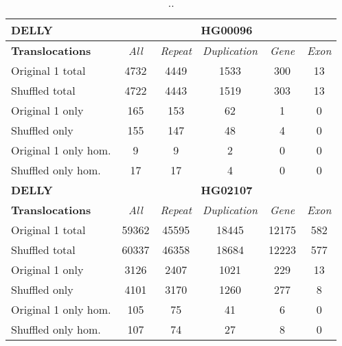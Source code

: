 \begin{table}[htb]
\caption{ .. }
\begin{center}
\begin{tabular}{|l|c||c|c|c|c|}
\hline
{\bf DELLY} & \multicolumn{5}{|c|}{\bf HG00096} \\
\hline
\cline{2-6}
{\bf Translocations} & {\it All} & {\it Repeat} & {\it Duplication} & {\it Gene} & {\it Exon} \\
\hline
Original 1 total & 4732 & 4449 & 1533 & 300 & 13\\ 
\hline
Shuffled total & 4722 & 4443 & 1519 & 303 & 13\\ 
\hline
Original 1 only & 165 & 153 & 62 & 1 & 0\\ 
\hline
Shuffled only & 155 & 147 & 48 & 4 & 0\\ 
\hline
Original 1 only hom. & 9 & 9 & 2 & 0 & 0\\ 
\hline
Shuffled only hom. & 17 & 17 & 4 & 0 & 0\\ 
\hline
\hline
{\bf DELLY} & \multicolumn{5}{|c|}{\bf HG02107} \\
\hline
\cline{2-6}
{\bf Translocations} & {\it All} & {\it Repeat} & {\it Duplication} & {\it Gene} & {\it Exon} \\
\hline
Original 1 total & 59362 & 45595 & 18445 & 12175 & 582\\ 
\hline
Shuffled total & 60337 & 46358 & 18684 & 12223 & 577\\ 
\hline
Original 1 only & 3126 & 2407 & 1021 & 229 & 13\\ 
\hline
Shuffled only & 4101 & 3170 & 1260 & 277 & 8\\ 
\hline
Original 1 only hom. & 105 & 75 & 41 & 6 & 0\\ 
\hline
Shuffled only hom. & 107 & 74 & 27 & 8 & 0\\ 
\hline
\end{tabular}
\end{center}
\label{tab:orig-vs-shuf-delly-trans}
\end{table}


